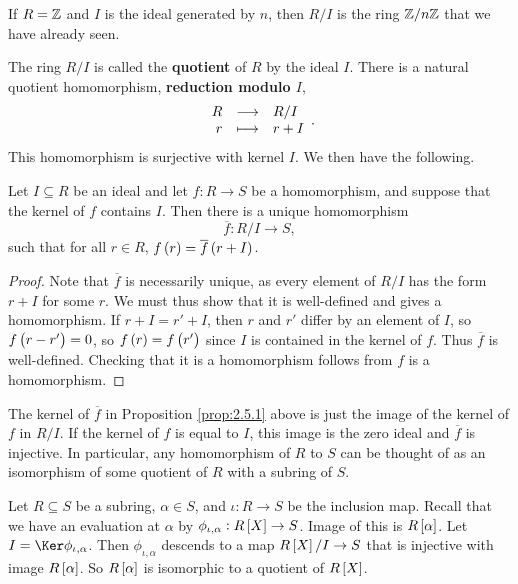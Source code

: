 \pagebreak

\begin{example*}
If $ R = \mathbb{Z} $ and $ I $ is the ideal generated by $ n $, then $ R / I $ is the ring $ \mathbb{Z} / n\mathbb{Z} $ that we have already seen.
\end{example*}

The ring $ R / I $ is called the \textbf{quotient} of $ R $ by the ideal $ I $. There is a natural quotient homomorphism, \textbf{reduction modulo $ I $},
$$ \function{R}{R / I}{r}{r + I}. $$
This homomorphism is surjective with kernel $ I $. We then have the following.

\begin{proposition}
\label{prop:2.5.1}
Let $ I \subseteq R $ be an ideal and let $ f : R \to S $ be a homomorphism, and suppose that the kernel of $ f $ contains $ I $. Then there is a unique homomorphism
$$ \overline{f} : R / I \to S, $$
such that for all $ r \in R $, $ f\br{r} = \overline{f}\br{r + I} $.
\end{proposition}

\begin{proof}
Note that $ \overline{f} $ is necessarily unique, as every element of $ R / I $ has the form $ r + I $ for some $ r $. We must thus show that it is well-defined and gives a homomorphism. If $ r + I = r' + I $, then $ r $ and $ r' $ differ by an element of $ I $, so $ f\br{r - r'} = 0 $, so $ f\br{r} = f\br{r'} $ since $ I $ is contained in the kernel of $ f $. Thus $ \overline{f} $ is well-defined. Checking that it is a homomorphism follows from $ f $ is a homomorphism.
\end{proof}

\begin{note*}
The kernel of $ \overline{f} $ in Proposition \ref{prop:2.5.1} above is just the image of the kernel of $ f $ in $ R / I $. If the kernel of $ f $ is equal to $ I $, this image is the zero ideal and $ \overline{f} $ is injective. In particular, any homomorphism of $ R $ to $ S $ can be thought of as an isomorphism of some quotient of $ R $ with a subring of $ S $.
\end{note*}

\begin{example*}
Let $ R \subseteq S $ be a subring, $ \alpha \in S $, and $ \iota : R \to S $ be the inclusion map. Recall that we have an evaluation at $ \alpha $ by $ \phi_{\iota, \alpha} : R\sbr{X} \to S $. Image of this is $ R\sbr{\alpha} $. Let $ I = \Ker \phi_{\iota, \alpha} $. Then $ \phi_{\iota, \alpha} $ descends to a map $ R\sbr{X} / I \to S $ that is injective with image $ R\sbr{\alpha} $. So $ R\sbr{\alpha} $ is isomorphic to a quotient of $ R\sbr{X} $.
\end{example*}

